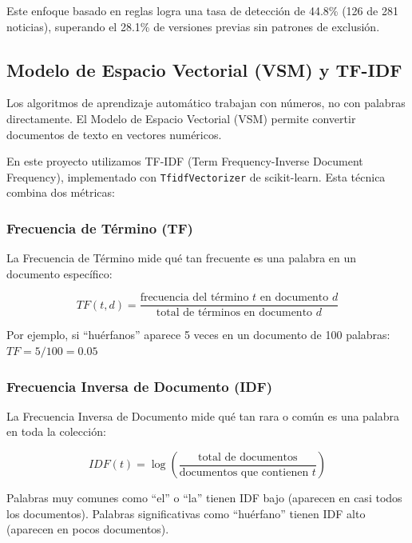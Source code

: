 Este enfoque basado en reglas logra una tasa de detección de 44.8\% (126 de 281 noticias), superando el 28.1\% de versiones previas sin patrones de exclusión.

\subsection{Modelo de Espacio Vectorial (VSM) y TF-IDF}
\label{subsec:tfidf}

Los algoritmos de aprendizaje automático trabajan con números, no con palabras directamente. El Modelo de Espacio Vectorial (VSM) permite convertir documentos de texto en vectores numéricos.

En este proyecto utilizamos TF-IDF (Term Frequency-Inverse Document Frequency), implementado con \texttt{TfidfVectorizer} de scikit-learn. Esta técnica combina dos métricas:

\subsubsection{Frecuencia de Término (TF)}
\label{subsubsec:tf}

La Frecuencia de Término mide qué tan frecuente es una palabra en un documento específico:

\begin{equation}
TF(t,d) = \frac{\text{frecuencia del término } t \text{ en documento } d}{\text{total de términos en documento } d}
\end{equation}

Por ejemplo, si ``huérfanos'' aparece 5 veces en un documento de 100 palabras: $TF = 5/100 = 0.05$

\subsubsection{Frecuencia Inversa de Documento (IDF)}
\label{subsubsec:idf}

La Frecuencia Inversa de Documento mide qué tan rara o común es una palabra en toda la colección:

\begin{equation}
IDF(t) = \log\left(\frac{\text{total de documentos}}{\text{documentos que contienen } t}\right)
\end{equation}

Palabras muy comunes como ``el'' o ``la'' tienen IDF bajo (aparecen en casi todos los documentos). Palabras significativas como ``huérfano'' tienen IDF alto (aparecen en pocos documentos).


